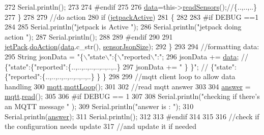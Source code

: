 \begin{DoxyCode}
272         Serial.println();
273     
274 \textcolor{preprocessor}{    #endif}
275 
276         \hyperlink{classCoolBoard_a427fb753dd8575bdf821c70a5c63d695}{data}=this->\hyperlink{classCoolBoard_ad03abdce2e65f520bbf2cff0f2d083cf}{readSensors}();\textcolor{comment}{//\{..,..,..\}}
277     \}
278     
279     \textcolor{comment}{//do action}
280     \textcolor{keywordflow}{if} (\hyperlink{classCoolBoard_a9be03a913d26e558328935ca3b59a75e}{jetpackActive})
281     \{
282     
283 \textcolor{preprocessor}{    #if DEBUG ==1}
284 
285         Serial.println(\textcolor{stringliteral}{"jetpack is Active "});
286         Serial.println(\textcolor{stringliteral}{"jetpack doing action "});
287         Serial.println();
288 
289 \textcolor{preprocessor}{    #endif}
290 
291         \hyperlink{classCoolBoard_a30b1357881b01ccbec676856a91e48e9}{jetPack}.\hyperlink{classJetpack_a86d2e83436ef4b85f4c3a6e85ac785b0}{doAction}(\hyperlink{classCoolBoard_a427fb753dd8575bdf821c70a5c63d695}{data}.c\_str(), \hyperlink{classCoolBoard_a58e4b6072e3ac8b141ec0befb479208e}{sensorJsonSize});
292     \}
293     
294     \textcolor{comment}{//formatting data:}
295     String jsonData = \textcolor{stringliteral}{"\{\(\backslash\)"state\(\backslash\)":\{\(\backslash\)"reported\(\backslash\)":"};
296     jsonData += \hyperlink{classCoolBoard_a427fb753dd8575bdf821c70a5c63d695}{data}; \textcolor{comment}{// \{"state":\{"reported":\{..,..,..,..,..,..,..,..\}}
297     jsonData += \textcolor{stringliteral}{" \} \}"}; \textcolor{comment}{// \{"state":\{"reported":\{..,..,..,..,..,..,..,..\}  \} \}}
298     
299     \textcolor{comment}{//mqtt client loop to allow data handling}
300     \hyperlink{classCoolBoard_a2399f44d7c23c1149a335cb3b46d90f1}{mqtt}.\hyperlink{classCoolMQTT_aa5eaae967b562b62cbcf2b8d81f6e5d5}{mqttLoop}();
301 
302     \textcolor{comment}{//read mqtt answer}
303     
304     \hyperlink{classCoolBoard_a7b835fafd449e5282f7f91d787a2dc15}{answer} = \hyperlink{classCoolBoard_a2399f44d7c23c1149a335cb3b46d90f1}{mqtt}.\hyperlink{classCoolMQTT_ae3c18f6ae9723746d32765f1c8f176ca}{read}();
305 
306 \textcolor{preprocessor}{#if DEBUG == 1 }
307 
308     Serial.println(\textcolor{stringliteral}{"checking if there's an MQTT message "} );
309     Serial.println(\textcolor{stringliteral}{"answer is : "}); 
310     Serial.println(\hyperlink{classCoolBoard_a7b835fafd449e5282f7f91d787a2dc15}{answer});   
311     Serial.println();
312 
313 \textcolor{preprocessor}{#endif  }
314 
315 
316     \textcolor{comment}{//check if the configuration needs update }
317     \textcolor{comment}{//and update it if needed }

\end{DoxyCode}
